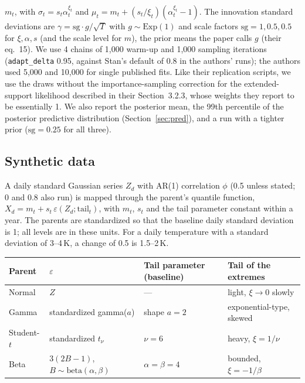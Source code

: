 \documentclass[11pt]{article}
\begin{document}
\begin{description}
  $m_t$, with $\sigma_t=s_t\alpha_t^{\xi_t}$ and $\mu_t=m_t+(s_t/\xi_t)(\alpha_t^{\xi_t}-1)$.
  The innovation standard deviations are $\gamma=\mathrm{sg}\cdot g/\sqrt T$ with
  $g\sim\mathrm{Exp}(1)$ and scale factors $\mathrm{sg}=1,0.5,0.5$ for $\xi,\alpha,s$ (and the
  scale level for $m$), the prior means the paper calls $g$ (their eq.~15). We use 4 chains of
  1,000 warm-up and 1,000 sampling iterations (\texttt{adapt\_delta} 0.95, against Stan's default of
  0.8 in the authors' runs); the authors used 5,000 and 10,000 for single published fits. Like
  their replication scripts, we use the draws without the importance-sampling correction for the
  extended-support likelihood described in their Section~3.2.3, whose weights they report to be
  essentially 1. We
  also report the posterior mean, the 99th percentile of the posterior predictive distribution
  (Section~\ref{sec:pred}), and a run with a tighter prior ($\mathrm{sg}=0.25$ for all three).
\end{description}

\subsection{Synthetic data}

A daily standard Gaussian series $Z_d$ with AR(1) correlation $\phi$ (0.5 unless stated; 0 and
0.8 also run) is mapped through the parent's quantile function,
$X_d=m_t+s_t\,\varepsilon(Z_d;\text{tail}_t)$, with $m_t$, $s_t$ and the tail parameter constant
within a year. The parents are standardized so that the baseline daily standard deviation is 1;
all levels are in these units. For a daily temperature with a standard deviation of 3--4\,K, a
change of 0.5 is 1.5--2\,K.

\begin{center}
\small
\begin{tabular}{llll}
\toprule
Parent & $\varepsilon$ & Tail parameter (baseline) & Tail of the extremes \\
\midrule
Normal & $Z$ & --- & light, $\xi\to0$ slowly \\
Gamma & standardized gamma($a$) & shape $a=2$ & exponential-type, skewed \\
Student-$t$ & standardized $t_\nu$ & $\nu=6$ & heavy, $\xi=1/\nu$ \\
Beta & $3(2B-1)$, $B\sim\mathrm{beta}(\alpha,\beta)$ & $\alpha=\beta=4$ & bounded, $\xi=-1/\beta$ \\
\bottomrule
\end{tabular}
\end{center}
\end{document}
